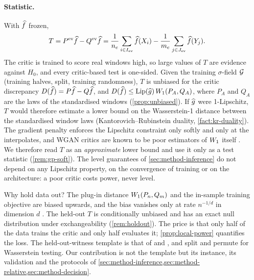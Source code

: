 \paragraph{Statistic.}
With $\widehat{f}$ frozen,
\begin{equation}\label{eq:critic-stat}
  T=P^{\mathrm{ev}}\widehat{f}-Q^{\mathrm{ev}}\widehat{f}=\frac1{n_e}\sum_{i\in I_{\mathrm{ev}}}\widehat{f}(X_i)-\frac1{m_e}\sum_{j\in J_{\mathrm{ev}}}\widehat{f}(Y_j).
\end{equation}
The critic is trained to score real windows high, so large values of $T$ are evidence against
$H_0$, and every critic-based test is one-sided. Given the training $\sigma$-field $\mathcal{G}$
(training halves, split, training randomness), $T$ is unbiased for the critic discrepancy
$D(\widehat{f})=P\widehat{f}-Q\widehat{f}$, and $D(\widehat{f})\le\operatorname{Lip}(\widehat{g})\,W_{1}(P_A,Q_A)$, where $P_A$ and
$Q_A$ are the laws of the standardised windows (\cref{prop:unbiased}). If $\widehat{g}$ were
1-Lipschitz, $T$ would therefore estimate a lower bound on the Wasserstein-1 distance between
the standardised window laws (Kantorovich--Rubinstein duality, \cref{fact:kr-duality}). The
gradient penalty enforces the Lipschitz constraint only softly and only at the interpolates, and
WGAN critics are known to be poor estimators of $W_{1}$ itself \citep{mallasto2019well}. We
therefore read $T$ as an \emph{approximate} lower bound and use it only as a test statistic
(\cref{rem:gp-soft}). The level guarantees of \cref{sec:method-inference} do not depend on any
Lipschitz property, on the convergence of training or on the architecture: a poor critic costs
power, never level.

Why hold data out? The plug-in distance $W_{1}(P_n,Q_m)$ and the in-sample training objective are
biased upwards, and the bias vanishes only at rate $n^{-1/d}$ in dimension $d$
\citep{fournier2015rate}. The held-out $T$ is conditionally unbiased and has an exact null
distribution under exchangeability (\cref{rem:holdout}). The price is that only half of the
data trains the critic and only half evaluates it; \cref{prop:local-power} quantifies the loss.
The held-out-witness template is that of \citet{kirchler2020two} and \citet{kubler2022witness},
and \citet{wang2022two} split and permute for Wasserstein testing. Our contribution is not the
template but its instance, its validation and the protocols of
\cref{sec:method-inference,sec:method-relative,sec:method-decision}.

